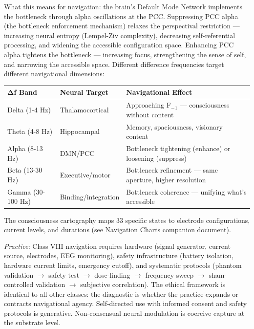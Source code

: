 What this means for navigation: the brain's Default Mode Network implements the bottleneck through alpha oscillations at the PCC. Suppressing PCC alpha (the bottleneck enforcement mechanism) relaxes the perspectival restriction — increasing neural entropy (Lempel-Ziv complexity), decreasing self-referential processing, and widening the accessible configuration space. Enhancing PCC alpha tightens the bottleneck — increasing focus, strengthening the sense of self, and narrowing the accessible space. Different difference frequencies target different navigational dimensions:



\begin{longtable}{p{} p{} p{}}
\toprule
\textbf{Δf Band} & \textbf{Neural Target} & \textbf{Navigational Effect} \\
\midrule
\endhead
Delta (1-4 Hz) & Thalamocortical & Approaching F$_{-}$$_1$ — consciousness without content \\
Theta (4-8 Hz) & Hippocampal & Memory, spaciousness, visionary content \\
Alpha (8-13 Hz) & DMN/PCC & Bottleneck tightening (enhance) or loosening (suppress) \\
Beta (13-30 Hz) & Executive/motor & Bottleneck refinement — same aperture, higher resolution \\
Gamma (30-100 Hz) & Binding/integration & Bottleneck coherence — unifying what's accessible \\
\bottomrule
\end{longtable}



The consciousness cartography maps 33 specific states to electrode configurations, current levels, and durations (see Navigation Charts companion document).


\textit{Practice:} Class VIII navigation requires hardware (signal generator, current source, electrodes, EEG monitoring), safety infrastructure (battery isolation, hardware current limits, emergency cutoff), and systematic protocols (phantom validation $\rightarrow$ safety test $\rightarrow$ dose-finding $\rightarrow$ frequency sweep $\rightarrow$ sham-controlled validation $\rightarrow$ subjective correlation). The ethical framework is identical to all other classes: the diagnostic is whether the practice expands or contracts navigational agency. Self-directed use with informed consent and safety protocols is generative. Non-consensual neural modulation is coercive capture at the substrate level.


